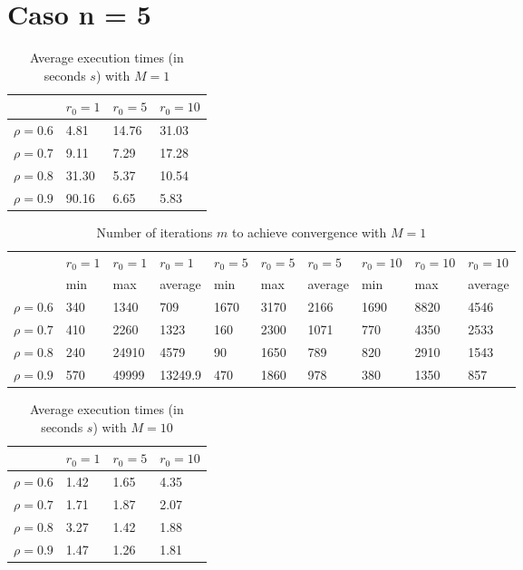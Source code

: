 \documentclass[a4paper,11pt,openright]{report}
\begin{document}
\section*{Caso n = 5} 
\begin{table}[H]
\centering
\addtolength{\leftskip}{-1.5cm}
\addtolength{\rightskip}{-1.5cm}
\begin{tabular}{|c|lll|}
\hline
$ $ & $r_0 = 1$ & $r_0 = 5$ & $r_0 = 10$ \\
\hline
$\rho = 0.6$ & 4.81 & 14.76 & 31.03 \\

$\rho = 0.7$ & 9.11 & 7.29 & 17.28 \\

$\rho = 0.8$ & 31.30 & 5.37 & 10.54 \\

$\rho = 0.9$ & 90.16 & 6.65 & 5.83 \\
\hline
\end{tabular}
\caption{Average execution
 times (in seconds $s$) with $M = 1$}
\end{table}
\begin{table}[H]
\centering
\addtolength{\leftskip}{-1.5cm}
\addtolength{\rightskip}{-1.5cm}
\begin{tabular}{|c|lllllllll|}
\hline
$ $ & $r_0 = 1$ & $r_0 = 1$ & $r_0 = 1$ & $r_0 = 5$ & $r_0 = 5$ & $r_0 = 5$ & $r_0 = 10$ & $r_0 = 10$ & $r_0 = 10$  \\
$ $ & min & max & average & min & max & average & min & max & average \\ 
\hline
$\rho = 0.6$ & 340 & 1340 & 709 & 1670 & 3170 & 2166 & 1690 & 8820 & 4546 \\

$\rho = 0.7$ & 410 & 2260 & 1323 & 160 & 2300 & 1071 & 770 & 4350 & 2533\\

$\rho = 0.8$ & 240 & 24910 & 4579 & 90 & 1650 & 789 & 820 & 2910 & 1543\\

$\rho = 0.9$ & 570 & 49999 & 13249.9 & 470 & 1860 & 978 & 380 & 1350 & 857\\
\hline
\end{tabular}
\caption{Number of iterations $m$ to achieve convergence with $M = 1$}
\end{table}
\begin{table}[H]
\centering
\addtolength{\leftskip}{-1.5cm}
\addtolength{\rightskip}{-1.5cm}
\begin{tabular}{|c|lll|}
\hline
$ $ & $r_0 = 1$ & $r_0 = 5$ & $r_0 = 10$ \\
\hline
$\rho = 0.6$ & 1.42 & 1.65 & 4.35 \\

$\rho = 0.7$ & 1.71 & 1.87 &  2.07 \\

$\rho = 0.8$ & 3.27 & 1.42 & 1.88 \\

$\rho = 0.9$ & 1.47 & 1.26 & 1.81 \\
\hline
\end{tabular}
\caption{Average execution
 times (in seconds $s$) with $M = 10$}
\end{table}
\end{document}
